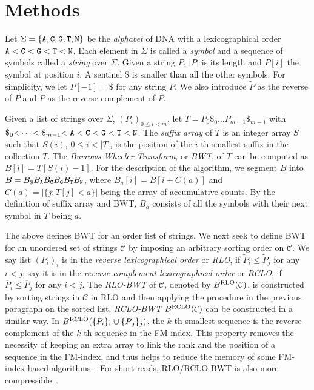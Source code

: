\documentclass{bioinfo}
\begin{document}
\section{Methods}
\begin{methods}
Let $\Sigma=\{{\tt A},{\tt C},{\tt G},{\tt T},{\tt N}\}$ be the \emph{alphabet}
of DNA with a lexicographical order
${\tt A\char60C\char60G\char60T\char60N}$. Each element in $\Sigma$ is
called a \emph{symbol} and a sequence of symbols called a \emph{string} over
$\Sigma$. Given a string $P$, $|P|$ is its length and $P[i]$ the symbol at
position $i$. A sentinel $\$$ is smaller
than all the other symbols. For simplicity, we let $P[-1]=\$$ for any string
$P$. We also introduce $\widetilde{P}$ as the reverse of $P$ and
$\overline{P}$ as the reverse complement of $P$.

Given a list of strings over $\Sigma$, $(P_i)_{0\le i<m}$, let
$T=P_0\$_0\ldots P_{m-1}\$_{m-1}$ with
${\tt\char36}_0{\tt\char60}\cdots{\char60\tt\char36}_{m-1}{\tt\char60A\char60C\char60G\char60T\char60N}$.
The \emph{suffix array} of $T$ is an integer array $S$ such that $S(i)$,
\mbox{$0\le i<|T|$}, is the position of the $i$-th smallest suffix in the
collection $T$.  The \emph{Burrows-Wheeler Transform}, or \emph{BWT}, of $T$
can be computed as \mbox{$B[i]=T[S(i)-1]$}. For the description of the
algorithm, we segment $B$ into \mbox{$B=B_{\tt\$}B_{\tt A}B_{\tt C}B_{\tt
G}B_{\tt T}B_{\tt N}$}, where \mbox{$B_a[i]=B[i+C(a)]$} and
\mbox{$C(a)=|\{j:T[j]<a\}|$} being the array of accumulative counts. By the
definition of suffix array and BWT, $B_a$ consists of all the symbols with
their next symbol in $T$ being $a$.

The above defines BWT for an order list of strings. We next seek to define BWT
for an unordered set of strings $\mathcal{C}$ by imposing an arbitrary sorting
order on $\mathcal{C}$.  We say list $(P_i)_i$ is in the \emph{reverse
lexicographical order} or \emph{RLO}, if $\widetilde{P}_i\le\widetilde{P}_j$
for any $i<j$; say it is in the \emph{reverse-complement lexicographical order}
or \emph{RCLO}, if $\overline{P}_i\le\overline{P}_j$ for any $i<j$.
The \emph{RLO-BWT} of $\mathcal{C}$, denoted by $B^{\rm RLO}(\mathcal{C})$,
is constructed by sorting strings in $\mathcal{C}$ in RLO and then applying
the procedure in the previous paragraph on the sorted list. \emph{RCLO-BWT}
$B^{\rm RCLO}(\mathcal{C})$ can be constructed in a similar way. In
$B^{\rm RCLO}(\{P_i\}_i\cup\{\overline{P}_j\}_j)$, the $k$-th smallest
sequence is the reverse complement of the $k$-th sequence in the FM-index. This
property removes the necessity of keeping an extra array to link the rank and
the position of a sequence in the FM-index, and thus helps to reduce the memory
of some FM-index based algorithms~\citep{Simpson:2012aa}. For short reads, RLO/RCLO-BWT
is also more compressible~\citep{Cox:2012ly}.


\end{methods}
\end{document}

